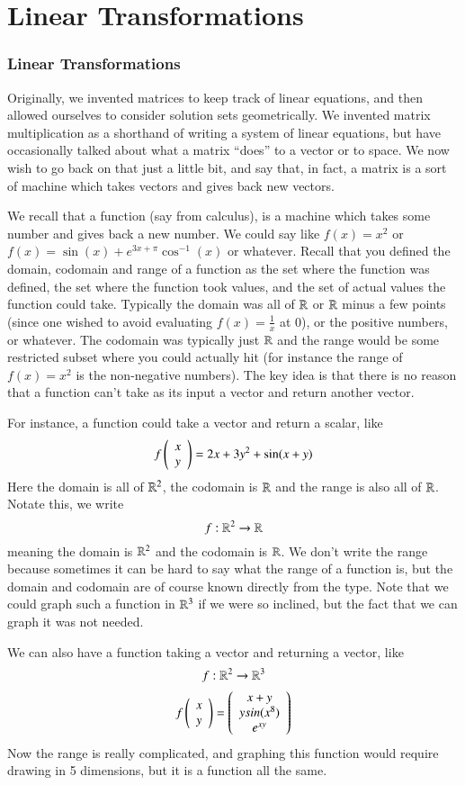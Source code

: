 \part{Linear Transformations}
\section{Linear Transformations}
\label{sec:lineartransforms}

Originally, we invented matrices to keep track of linear equations, and then allowed ourselves to consider solution sets geometrically.
We invented matrix multiplication as a shorthand of writing a system of linear equations, but have occasionally talked about what a matrix ``does'' to a vector or to space.
We now wish to go back on that just a little bit, and say that, in fact, a matrix is a sort of machine which takes vectors and gives back new vectors.

We recall that a function (say from calculus), is a machine which takes some number and gives back a new number.
We could say like $f(x)=x^2$ or $f(x)=\sin(x) + e^{3x+\pi}\cos^{-1}(x)$ or whatever.
Recall that you defined the domain, codomain and range of a function as the set where the function was defined, the set where the function took values, and the set of actual values the function could take.  
Typically the domain was all of $\mathbb{R}$ or $\mathbb{R}$ minus a few points (since one wished to avoid evaluating $f(x)=\frac{1}{x}$ at 0), or the positive numbers, or whatever.
The codomain was typically just $\mathbb{R}$ and the range would be some restricted subset where you could actually hit (for instance the range of $f(x)=x^2$ is the non-negative numbers).
The key idea is that there is no reason that a function can't take as its input a vector and return another vector.

For instance, a function could take a vector and return a scalar, like
\[f\left(\begin{array}{c}x\\y\end{array}\right) = 2x + 3y^2 + \sin(x+y)\]
Here the domain is all of $\mathbb{R}^2$, the codomain is $\mathbb{R}$ and the range is also all of $\mathbb{R}$.
Notate this, we write
\[f:\mathbb{R}^2\to \mathbb{R}\]
meaning the domain is $\mathbb{R}^2$ and the codomain is $\mathbb{R}$.
We don't write the range because sometimes it can be hard to say what the range of a function is, but the domain and codomain are of course known directly from the type.
Note that we could graph such a function in $\mathbb{R}^3$ if we were so inclined, but the fact that we can graph it was not needed.  

We can also have a function taking a vector and returning a vector, like
\[f:\mathbb{R}^2\to \mathbb{R}^3\]
\[f\left(\begin{array}{c}x\\y\end{array}\right) =\left(\begin{array}{c}x+y\\ysin(x^8)\\e^{xy}\end{array}\right)\]
Now the range is really complicated, and graphing this function would require drawing in 5 dimensions, but it is a function all the same.

